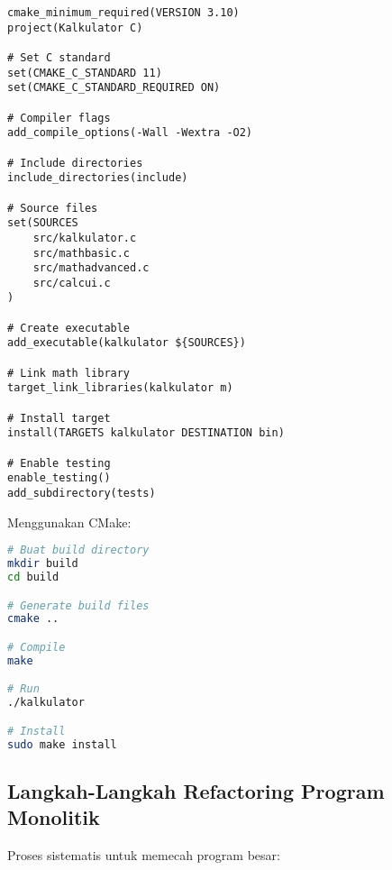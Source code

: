 \documentclass[../main.tex]{subfiles}
\begin{document}
\begin{lstlisting}[caption={CMakeLists.txt lengkap}]
cmake_minimum_required(VERSION 3.10)
project(Kalkulator C)

# Set C standard
set(CMAKE_C_STANDARD 11)
set(CMAKE_C_STANDARD_REQUIRED ON)

# Compiler flags
add_compile_options(-Wall -Wextra -O2)

# Include directories
include_directories(include)

# Source files
set(SOURCES
    src/kalkulator.c
    src/mathbasic.c
    src/mathadvanced.c
    src/calcui.c
)

# Create executable
add_executable(kalkulator ${SOURCES})

# Link math library
target_link_libraries(kalkulator m)

# Install target
install(TARGETS kalkulator DESTINATION bin)

# Enable testing
enable_testing()
add_subdirectory(tests)
\end{lstlisting}

Menggunakan CMake:
\begin{lstlisting}[language=bash, caption={Build dengan CMake}]
# Buat build directory
mkdir build
cd build

# Generate build files
cmake ..

# Compile
make

# Run
./kalkulator

# Install
sudo make install
\end{lstlisting}

\subsection{Langkah-Langkah Refactoring Program Monolitik}

Proses sistematis untuk memecah program besar:
\end{document}
